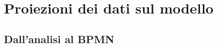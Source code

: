 \documentclass[10pt]{beamer}
\begin{document}

    

  \section{Proiezioni dei dati sul modello}
    \subsection{Dall'analisi al BPMN}
  
\end{document}

